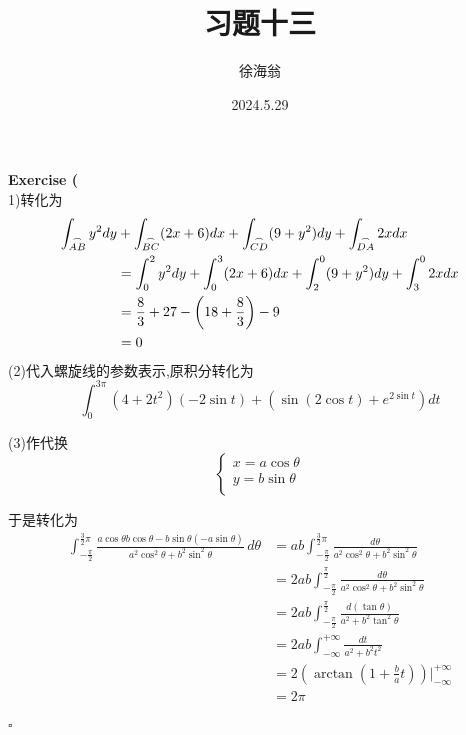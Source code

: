 \documentclass[11pt,hyperref,a4paper,UTF8]{ctexart}
\title{习题十三}
\author{徐海翁}
\date{2024.5.29}
\newenvironment{exercise}[1]{%
{\textbf{Exercise #1} \\ 
    }
}{
  \hfill $\square$ 
  \par\bigskip 
}
\newcommand{\parameter}[1]{\left(#1\right)}
\begin{document}
\begin{CJK}{UTF8}{gkai}

\maketitle
\begin{exercise}{14}
    (1)转化为
    \[
        \begin{aligned}      
            \int_{\overset{\LARGE{\frown}}{AB}} y^2 dy &+ \int_{\overset{\LARGE{\frown}}{BC}} (2x + 6) dx + \int_{\overset{\LARGE{\frown}}{CD}} (9 + y^2) dy + \int_{\overset{\LARGE{\frown}}{DA}} 2xdx\\
            &= \int_{0}^2 y^2 dy + \int_{0}^3 (2x + 6) dx + \int_{2}^{0} (9 + y^2) dy + \int_{3}^0 2xdx\\
            &= \frac{8}{3} + 27 - \parameter{18 + \frac{8}{3}} - 9\\
            &= 0\\
        \end{aligned}
    \]
    (2)代入螺旋线的参数表示,原积分转化为
    \[\int_{0}^{3\pi} (4 + 2t^2)(-2\sin t) + (\sin (2\cos t) + e^{2\sin t}) dt\]

    (3)作代换
    \[\begin{cases}
        x = a\cos \theta\\
        y = b\sin \theta\\
    \end{cases}\]

    于是转化为
    \[
        \begin{aligned}
            \int_{-\frac{\pi}{2}}^{\frac{3}{2}\pi}\frac{a \cos \theta b \cos \theta - b \sin \theta (-a\sin\theta)}{a^2 \cos^2 \theta + b^2 \sin^2\theta}\, d\theta &= ab \int_{-\frac{\pi}{2}}^{\frac{3}{2}\pi} \frac{d\theta}{a^2 \cos^2 \theta + b^2 \sin^2\theta}\\
            &= 2ab \int_{-\frac{\pi}{2}}^{\frac{\pi}{2}} \frac{d\theta}{a^2 \cos^2 \theta + b^2 \sin^2\theta}\\
            &= 2ab \int_{-\frac{\pi}{2}}^{\frac{\pi}{2}} \frac{d(\tan \theta)}{a^2 + b^2 \tan^2\theta}\\
            &= 2ab \int_{-\infty}^{+\infty} \frac{dt}{a^2 + b^2 t^2}\\
            &= 2 \parameter{\arctan(1 + \frac{b}{a}t)}\bigg|_{-\infty}^{+\infty}\\
            &= 2\pi\\
        \end{aligned}
        \]


\end{exercise}
\end{CJK}
\end{document}
